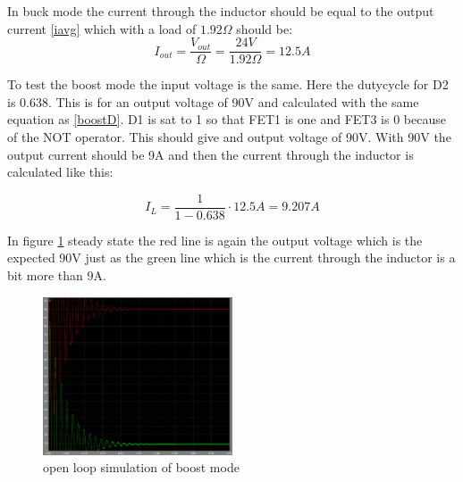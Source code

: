 In buck mode the current through the inductor should be equal to the output current \ref{iavg} which with a load of $1.92\Omega$ should be:
\begin{equation}
I_{out} = \frac{V_{out}}{\Omega} = \frac{24V}{1.92\Omega} = 12.5A
\end{equation}   

To test the boost mode the input voltage is the same. Here the dutycycle for D2 is 0.638. This is for an output voltage of 90V and calculated with the same equation as \ref{boostD}. D1 is sat to 1 so that FET1 is one and FET3 is 0 because of the NOT operator. This should give and output voltage of 90V. With 90V the output current should be 9A and then the current through the inductor is calculated like this:

\begin{equation}
I_{L} = \frac{1}{1-0.638}\cdot 12.5A = 9.207A
\end{equation}  

In figure \ref{boostsim} steady state the red line is again the output voltage which is the expected 90V just as the green line which is the current through the inductor is a bit more than 9A.

\begin{figure}[H]
	\begin{center}
		\includegraphics[width=0.5\textwidth]{../Pictures/boostsim}
		\caption{open loop simulation of boost mode}
		\label{boostsim}
	\end{center}
\end{figure}
